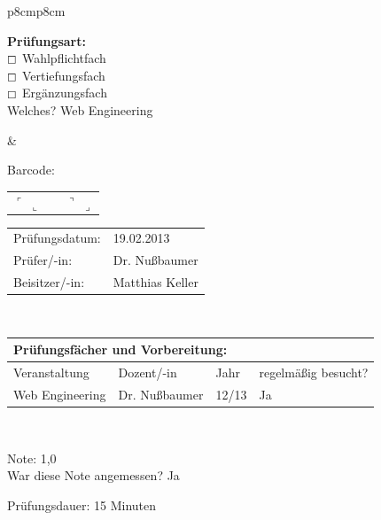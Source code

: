 \documentclass[a4paper]{article}
\newcommand{\Fach}{Web Engineering}
\newcommand{\Pruefungsdatum}{19.02.2013}    %
\newcommand{\Pruefer}{Dr. Nußbaumer}
\newcommand{\Beisitzer}{Matthias Keller}
\newcommand{\Note}{1,0}
\newcommand{\Dauer}{15} %
\begin{document}
\begin{tabular}{p{8cm}p{8cm}}
\begin{flushleft}
   \textbf{Prüfungsart:}\\
   $\boxempty$ Wahlpflichtfach  \\
   $\boxempty$ Vertiefungsfach  \\
   $\boxempty$ Ergänzungsfach  \\[0.5cm]
   Welches? \Fach
  \end{flushleft}
  & 
  \begin{center}
   Barcode:
   \begin{tabular}{p{0.2cm}p{6.8cm}p{0.2cm}} 
   $\ulcorner$
   \vskip 2cm
   $\llcorner$ & & $\urcorner$
   \vskip 2cm
   $\lrcorner$ \\
   \end{tabular}
  \end{center}
  \vskip 0.5cm
  \begin{flushright}
  \begin{tabular}{ll}
   Prüfungsdatum:   & \Pruefungsdatum \\[0.5cm]
   Prüfer/-in:      & \Pruefer \\[0.5cm]
   Beisitzer/-in:   & \Beisitzer \\
  \end{tabular}
  \end{flushright} \\
 \end{tabular} 

 \begin{tabular}{|p{8.2cm}|p{3cm}|p{1cm}|p{3.5cm}|}
  \multicolumn{4}{l}{\bfseries Prüfungsfächer und Vorbereitung: } \\[0.2cm]
  \hline
  Veranstaltung & Dozent/-in  & Jahr & regelmäßig besucht? \\
  \hline
  \hline
  Web Engineering & Dr. Nußbaumer & 12/13 &  Ja \\[0.2cm]
  \hline
 \end{tabular} \\[0.5cm]

\begin{multicols}{2}
Note: \Note\\[0.5cm]
War diese Note angemessen?
Ja

\columnbreak
Prüfungsdauer: \Dauer{} Minuten \\[0.5cm]
\end{multicols}
\end{document}
